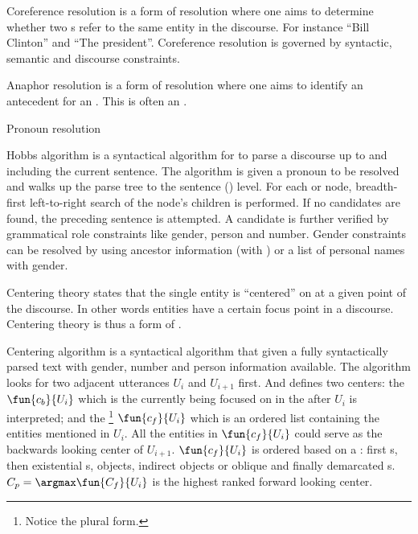 \begin{df}{Coreference resolution}
\sb{} is a form of resolution where one aims to determine whether two s refer to the same entity in the discourse. For instance ``Bill Clinton'' and ``The president''. Coreference resolution is governed by syntactic, semantic and discourse constraints.
\end{df}
\begin{df}{Anaphor resolution}
\sb{} is a form of resolution where one aims to identify an antecedent for an . This is often an .
\end{df}
\begin{df}{Pronoun resolution}

\end{df}
\begin{df}{Hobbs algorithm}
\sb{} is a syntactical algorithm for  to parse a discourse up to and including the current sentence. The algorithm is given a pronoun to be resolved and walks up the parse tree to the sentence () level. For each  or  node, breadth-first left-to-right search of the node's children is performed. If no candidates are found, the preceding sentence is attempted. A candidate is further verified by grammatical role constraints like gender, person and number. Gender constraints can be resolved by using ancestor information (with ) or a list of personal names with gender.
\end{df}
\begin{df}{Centering theory}
\sb{} states that the single entity is ``centered'' on at a given point of the discourse. In other words entities have a certain focus point in a discourse. Centering theory is thus a form of .
\end{df}
\begin{df}{Centering algorithm}
\sb{} is a syntactical algorithm that given a fully syntactically parsed text with gender, number and person information available. The algorithm looks for two adjacent utterances $U_i$ and $U_{i+1}$ first. And defines two centers: the  $\fun{c_b}{U_i}$ which is the  currently being focused on in the  after $U_i$ is interpreted; and the \footnote{Notice the plural form.} $\fun{c_f}{U_i}$ which is an ordered list containing the entities mentioned in $U_i$. All the entities in $\fun{c_f}{U_i}$ could serve as the backwards looking center of $U_{i+1}$. $\fun{c_f}{U_i}$ is ordered based on a : first s, then existential s, objects, indirect objects or oblique and finally demarcated s. $C_p=\argmax \fun{C_f}{U_i}$ is the highest ranked forward looking center.
\end{df}